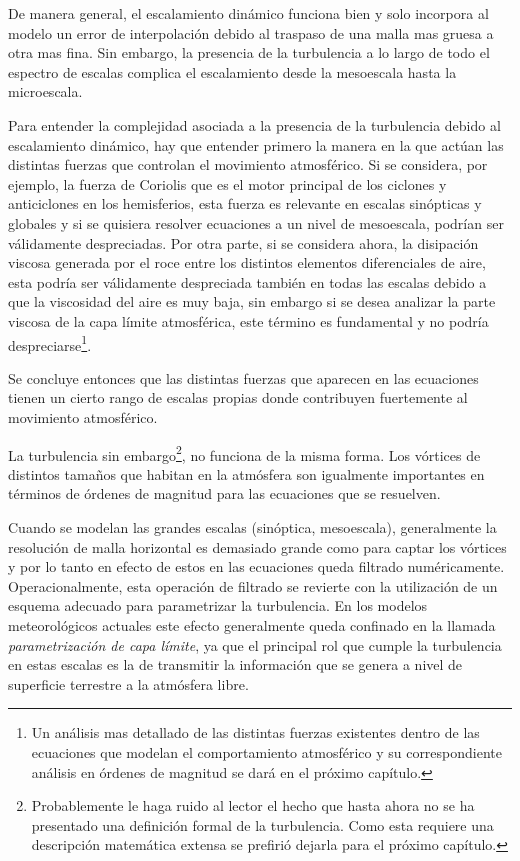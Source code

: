 De manera general, el escalamiento dinámico funciona bien y solo incorpora al modelo un error de interpolación debido al traspaso de una malla mas gruesa a otra mas fina. Sin embargo, la presencia de la turbulencia a lo largo de todo el espectro de escalas complica el escalamiento desde la mesoescala hasta la microescala.

Para entender la complejidad asociada a la presencia de la turbulencia debido al escalamiento dinámico, hay que entender primero la manera en la que actúan las distintas fuerzas que controlan el movimiento atmosférico. Si se considera, por ejemplo, la fuerza de Coriolis que es el motor principal de los ciclones y anticiclones en los hemisferios, esta fuerza es relevante en escalas sinópticas y globales y si se quisiera resolver ecuaciones a un nivel de mesoescala, podrían ser válidamente despreciadas. Por otra parte, si se considera ahora, la disipación viscosa generada por el roce entre los distintos elementos diferenciales de aire, esta podría ser válidamente despreciada también en todas las escalas debido a que la viscosidad del aire es muy baja, sin embargo si se desea analizar la parte viscosa de la capa límite atmosférica, este término es fundamental y no podría despreciarse\footnote{Un análisis mas detallado de las distintas fuerzas existentes dentro de las ecuaciones que modelan el comportamiento atmosférico y su correspondiente análisis en órdenes de magnitud se dará en el próximo capítulo.}. 
 
Se concluye entonces que las distintas fuerzas que aparecen en las ecuaciones tienen un cierto rango de escalas propias donde contribuyen fuertemente al movimiento atmosférico. 

La turbulencia sin embargo\footnote{Probablemente le haga ruido al lector el hecho que hasta ahora no se ha presentado una definición formal de la turbulencia. Como esta requiere una descripción matemática extensa se prefirió dejarla para el próximo capítulo.}, no funciona de la misma forma. Los vórtices de distintos tamaños que habitan en la atmósfera son igualmente importantes en términos de órdenes de magnitud para las ecuaciones que se resuelven.

Cuando se modelan las grandes escalas (sinóptica, mesoescala), generalmente la resolución de malla horizontal es demasiado grande como para captar los vórtices y por lo tanto en efecto de estos en las ecuaciones queda filtrado numéricamente. Operacionalmente, esta operación de filtrado se revierte con la utilización de un esquema adecuado para parametrizar la turbulencia. En los modelos meteorológicos actuales este efecto generalmente queda confinado en la llamada \emph{parametrización de capa límite}, ya que el principal rol que cumple la turbulencia en estas escalas es la de transmitir la información que se genera a nivel de superficie terrestre a la atmósfera libre.

